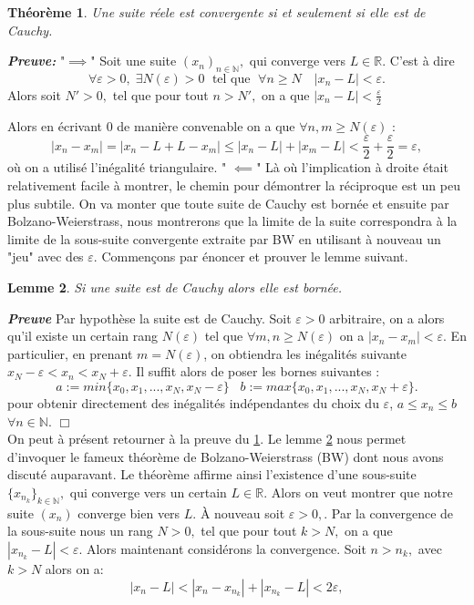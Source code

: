\documentclass[a4paper, 12pt, french, twoside]{article}
\newtheorem{theorem}{Théorème}[section]
\newtheorem{lemma}[theorem]{Lemme}
\newcommand{\Nn}{{\mathbb{N}}}
\newcommand{\Rr}{{\mathbb{R}}}
\begin{document}
\begin{theorem}\label{thm420}
Une suite réele est convergente si et seulement si elle est de Cauchy.
\end{theorem}

\textit{\textbf{Preuve:}} \newline 
"$\implies$"
     Soit une suite $(x_n)_{n\in \Nn},$ qui converge vers $L\in \Rr.$ C'est à dire 
    \[
    \forall \varepsilon>0, \; \exists N(\varepsilon) >0 \; \text{ tel que } \; \forall n\geq N \quad |x_n-L|<\varepsilon.
    \]
    Alors soit $N'>0,$ tel que pour tout $n > N',$ on a que   $ |x_n - L| < \frac{\varepsilon}{2}$

    Alors en écrivant 0 de manière convenable on a que $\forall n,m \ge N(\varepsilon)$ :
    $$ |x_n - x_m| = | x_n -L + L -x_m| \le |x_n - L | + | x_m -L | < \frac{\varepsilon}{2} + \frac{\varepsilon}{2} = \varepsilon,$$
    où on a utilisé l'inégalité triangulaire. \newline 
" $\impliedby$" Là où l'implication à droite était relativement facile à montrer, le chemin pour démontrer la réciproque est un peu plus subtile. On va monter que toute suite de Cauchy est bornée et ensuite par Bolzano-Weierstrass, nous montrerons que la limite de la suite correspondra à la limite de la sous-suite convergente extraite par BW en utilisant à nouveau un "jeu" avec des $\varepsilon$. Commençons par énoncer et prouver le lemme suivant. 
\begin{lemma}\label{lem46}
    Si une suite est de Cauchy alors elle est bornée. 
\end{lemma}  
\textit{\textbf{Preuve}} Par hypothèse la suite est de Cauchy. Soit $\varepsilon >0 $ arbitraire, on a alors qu'il existe un certain rang $N(\varepsilon)$ tel que $\forall m,n \ge N(\varepsilon)$ on a $|x_n-x_m| < \varepsilon$. En particulier, en prenant $m = N(\varepsilon)$, on obtiendra les inégalités suivante $x_N - \varepsilon < x_n < x_N + \varepsilon$. Il suffit alors de poser les bornes suivantes : 
$$ a := min \{x_0, x_1, ..., x_N, x_N - \varepsilon \} \;\;\; b := max \{x_0, x_1, ..., x_N, x_N + \varepsilon \}. $$
pour obtenir directement des inégalités indépendantes du choix du $\varepsilon$, $a \le x_n \le b $ $ \forall n \in \Nn$. $\Box$ \\ \newline
On peut à présent retourner à la preuve du \ref{thm420}. Le lemme \ref{lem46} nous permet d'invoquer le fameux théorème de Bolzano-Weierstrass (BW) dont nous avons discuté auparavant. 
Le théorème affirme ainsi l'existence d'une sous-suite $\{x_{n_k}\}_{k\in\Nn},$ qui converge vers un certain $L\in \Rr.$ Alors on veut montrer que notre suite $(x_n)$ converge bien vers $L.$
À nouveau soit $\varepsilon > 0,$. Par la convergence de la sous-suite nous un rang $N > 0,$ tel que pour tout $k > N,$ on a que $|x_{n_k} - L| < \varepsilon.$ Alors maintenant considérons la convergence. Soit $n > n_k,$ avec $k > N$ alors on a:
\[
|x_n - L| < |x_n - x_{n_k}| + |x_{n_k} - L| < 2\varepsilon,
\]
\end{document}
